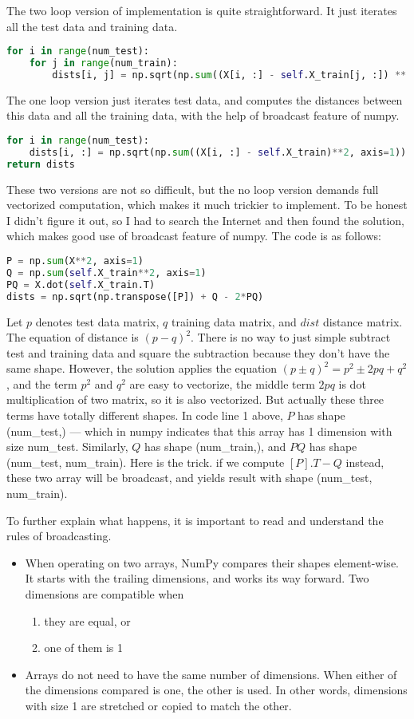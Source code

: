 \documentclass{article} %
\begin{document}
The two loop version of implementation is quite straightforward. It just iterates all the test data and training data.
\begin{lstlisting}[language=python]
for i in range(num_test):
    for j in range(num_train):
        dists[i, j] = np.sqrt(np.sum((X[i, :] - self.X_train[j, :]) ** 2))
\end{lstlisting}

The one loop version just iterates test data, and computes the distances between this data and all the training data, with the help of broadcast feature of numpy.
\begin{lstlisting}[language=python]
for i in range(num_test):
    dists[i, :] = np.sqrt(np.sum((X[i, :] - self.X_train)**2, axis=1))
return dists
\end{lstlisting}

These two versions are not so difficult, but the no loop version demands full vectorized computation, which makes it much trickier to implement. To be honest I didn't figure it out, so I had to search the Internet and then found the solution, which makes good use of broadcast feature of numpy. The code is as follows:
\begin{lstlisting}[language=python]
P = np.sum(X**2, axis=1)
Q = np.sum(self.X_train**2, axis=1)
PQ = X.dot(self.X_train.T)
dists = np.sqrt(np.transpose([P]) + Q - 2*PQ)
\end{lstlisting}
Let $p$ denotes test data matrix, $q$ training data matrix, and $dist$ distance matrix. The equation of distance is $(p-q)^2$. There is no way to just simple subtract test and training data and square the subtraction because they don't have the same shape. However, the solution applies the equation $(p\pm q)^2=p^2 \pm 2pq + q^2$, and the term $p^2$ and $q^2$ are easy to vectorize, the middle term $2pq$ is dot multiplication of two matrix, so it is also vectorized. But actually these three terms have totally different shapes. In code line 1 above, $P$ has shape (num\_test,) --- which in numpy indicates that this array has 1 dimension with size num\_test. Similarly, $Q$ has shape (num\_train,), and $PQ$ has shape (num\_test, num\_train). Here is the trick. if we compute $[P].T-Q$ instead, these two array will be broadcast, and yields result with shape (num\_test, num\_train).

To further explain what happens, it is important to read and understand the rules of broadcasting. 
\begin{itemize}
\item When operating on two arrays, NumPy compares their shapes element-wise. It starts with the trailing dimensions, and works its way forward. Two dimensions are compatible when
    \begin{enumerate}
        \item they are equal, or
        \item one of them is 1
    \end{enumerate}
\item Arrays do not need to have the same number of dimensions. When either of the dimensions compared is one, the other is used.  In other words, dimensions with size 1 are stretched or copied to match the other.
\end{itemize}
\end{document}
